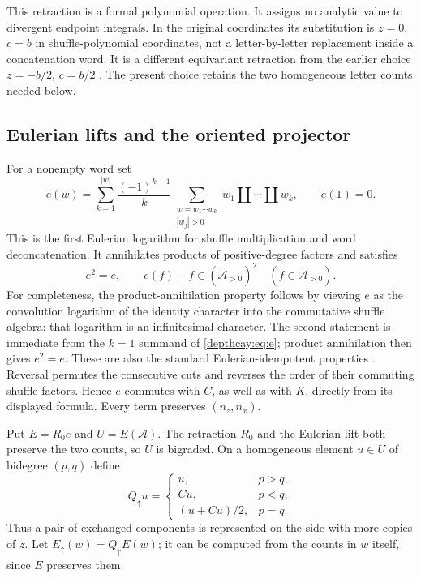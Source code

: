 \documentclass[11pt,a4paper]{article}
\numberwithin{equation}{section}
\theoremstyle{definition}
\theoremstyle{remark}
\newcommand{\shuffle}{\mathbin{\amalg}}
\begin{document}
This retraction is a formal polynomial operation. It assigns no analytic
value to divergent endpoint integrals. In the original coordinates its
substitution is $z=0$, $c=b$ in shuffle-polynomial coordinates, not a
letter-by-letter replacement inside a concatenation word. It is a
different equivariant retraction from the earlier choice
$z=-b/2$, $c=b/2$ \cite{depth:PriorProjection}. The present choice retains
the two homogeneous letter counts needed below.

\subsection{Eulerian lifts and the oriented projector}

For a nonempty word set
\begin{equation}\label{depthcay:eq:e}
 e(w)=\sum_{k=1}^{|w|}\frac{(-1)^{k-1}}{k}
 \sum_{\substack{w=w_1\cdots w_k\\|w_j|>0}}
 w_1\shuffle\cdots\shuffle w_k,
 \qquad e(1)=0.
\end{equation}
This is the first Eulerian logarithm for shuffle multiplication and
word deconcatenation. It annihilates products of positive-degree
factors and satisfies
\begin{equation}\label{depthcay:eq:e-properties}
 e^2=e,\qquad e(f)-f\in
 (\widetilde{\mathcal A}_{>0})^2
 \quad(f\in\widetilde{\mathcal A}_{>0}).
\end{equation}
For completeness, the product-annihilation property follows by viewing
$e$ as the convolution logarithm of the identity character into the
commutative shuffle algebra: that logarithm is an infinitesimal
character. The second statement is immediate from the $k=1$ summand
of \eqref{depthcay:eq:e}; product annihilation then gives $e^2=e$.
These are also the standard Eulerian-idempotent properties
\cite{depth:Patras}. Reversal permutes the consecutive cuts and reverses
the order of their commuting shuffle factors. Hence $e$ commutes with
$C$, as well as with $K$, directly from its displayed formula.
Every term preserves $(n_z,n_x)$.

Put $E=R_0e$ and $U=E(\mathcal A)$. The retraction $R_0$ and the
Eulerian lift both preserve the two counts, so $U$ is bigraded.
On a homogeneous element $u\in U$ of bidegree $(p,q)$ define
\begin{equation}\label{depthcay:eq:orientation}
 Q_{\uparrow}u=
 \begin{cases}
 u,&p>q,\\
 Cu,&p<q,\\
 (u+Cu)/2,&p=q.
 \end{cases}
\end{equation}
Thus a pair of exchanged components is represented on the side with
more copies of $z$. Let $E_{\uparrow}(w)=Q_{\uparrow}E(w)$; it can be
computed from the counts in $w$ itself, since $E$ preserves them.
\end{document}
